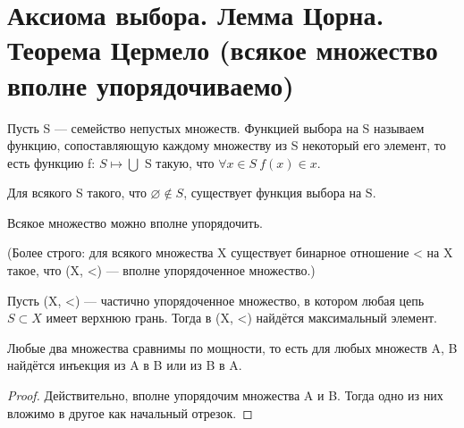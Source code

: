 \section{Аксиома выбора. Лемма Цорна. Теорема Цермело (всякое множество вполне упорядочиваемо)}
\begin{definition}
Пусть S — семейство непустых множеств. Функцией выбора на S называем функцию, сопоставляющую каждому множеству из S некоторый его элемент, то есть функцию f: $S \mapsto \bigcup$ S такую, что $\forall x \in S \ f(x) \in x$.
\end{definition}

\begin{theorem}  
Для всякого S такого, что $ \varnothing \notin S$, существует функция выбора на S.
\end{theorem}

\begin{theorem} 
Всякое множество можно вполне упорядочить.

(Более строго: для всякого множества X существует бинарное отношение < на X такое, что (X, <) — вполне упорядоченное множество.)
\end{theorem}

\begin{lemma} 
Пусть (X, <) — частично упорядоченное множество, в котором любая цепь $S \subset X$ имеет верхнюю грань. Тогда в (X, <) найдётся максимальный элемент.
\end{lemma}

\begin{theorem}
Любые два множества сравнимы по мощности, то есть для любых множеств A, B найдётся инъекция из A в B или из B в A.
\end{theorem}

\begin{proof}
Действительно, вполне упорядочим множества A и B. Тогда одно из них вложимо в другое как начальный отрезок.
\end{proof}